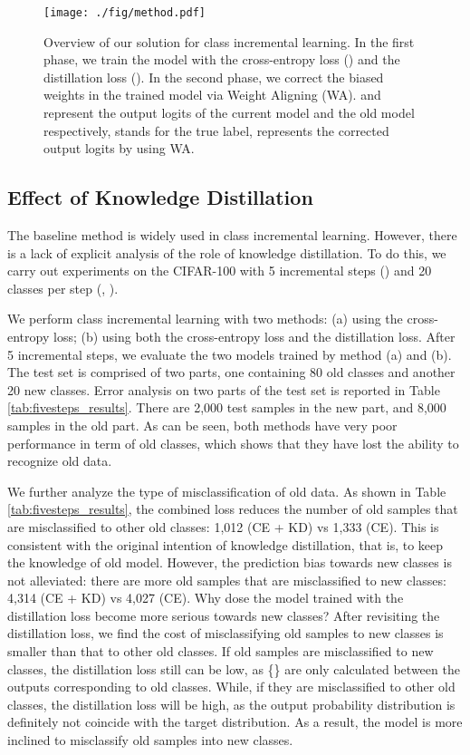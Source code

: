 \documentclass[10pt,twocolumn,letterpaper]{article}
\begin{document}
\begin{figure*}[t]
\centering
\texttt{[image: ./fig/method.pdf]}
\caption{Overview of our solution for class incremental learning. In the first phase, we train the model with the cross-entropy loss () and the distillation loss (). In the second phase, we correct the biased weights in the trained model via Weight Aligning (WA).  and  represent the output logits of the current model and the old model respectively,  stands for the true label,  represents the corrected output logits by using WA.}
\label{fig:method}
\end{figure*}  

\subsection{Effect of Knowledge Distillation}\label{sec:e_kd}
The baseline method is widely used in class incremental learning. However, there is a lack of explicit analysis of the role of knowledge distillation. To do this, we carry out experiments on the CIFAR-100 \cite{Krizhevsky09} with 5 incremental steps () and 20 classes per step (, ). 

We perform class incremental learning with two methods: (a) using the cross-entropy loss; (b) using both the cross-entropy loss and the distillation loss. After 5 incremental steps, we evaluate the two models trained by method (a) and (b). The test set is comprised of two parts, one containing 80 old classes and another 20 new classes. Error analysis on two parts of the test set is reported in Table \ref{tab:fivesteps_results}. There are 2,000 test samples in the new part, and 8,000 samples in the old part. As can be seen, both methods have very poor performance in term of old classes, which shows that they have lost the ability to recognize old data.

We further analyze the type of misclassification of old data. As shown in Table \ref{tab:fivesteps_results}, the combined loss reduces the number of old samples that are misclassified to other old classes: 1,012 (CE + KD) vs 1,333 (CE). This is consistent with the original intention of knowledge distillation, that is, to keep the knowledge of old model. 
However, the prediction bias towards new classes is not alleviated: there are more old samples that are misclassified to new classes: 4,314 (CE + KD) vs 4,027 (CE). Why dose the model trained with the distillation loss become more serious towards new classes? After revisiting the distillation loss, we find the cost of misclassifying old samples to new classes is smaller than that to other old classes. If old samples are misclassified to new classes, the distillation loss still can be low, as \{\} are only calculated between the outputs corresponding to old classes. While, if they are misclassified to other old classes, the distillation loss will be high, as the output probability distribution is definitely not coincide with the target distribution. As a result, the model is more inclined to misclassify old samples into new classes.
\end{document}
